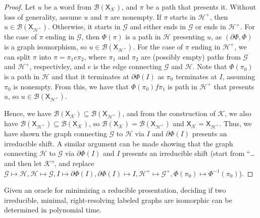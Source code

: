 \documentclass[hidelinks]{article}
\newcommand{\Gc}{\mathcal{G}}  %
\newcommand{\Hc}{\mathcal{H}}  %
\newcommand{\Bc}{\mathcal{B}}
\newcommand{\Kc}{\mathcal{K}}
\newcommand{\shift}[1]{\mathsf{X}_{#1}}
\theoremstyle{definition}
\begin{document}
\begin{proof}
        Let \(u\) be a word from \(\Bc(\shift{\Kc})\), and \(\pi\) be a path that presents it.
        Without loss of generality, assume \(u\) and \(\pi\) are nonempty.
        If \(\pi\) starts in \(\Hc^+\), then \(u \in \Bc(\shift{\Hc^+})\). Otherwise, it 
        starts in \(\Gc\) and either ends in \(\Gc\) or ends in \(\Hc^+\). 
        For the case of \(\pi\) ending in \(\Gc\), then \(\Phi(\pi)\) is a path in 
        \(\Hc\) presenting \(u\), as \((\partial\Phi, \Phi)\) is a graph isomorphism,
        so \(u \in \Bc(\shift{\Hc^+})\).
        For the case of \(\pi\) ending in \(\Hc^+\), we can split 
        \(\pi\) into \(\pi=\pi_1 e \pi_2\), where \(\pi_1\) and \(\pi_2\)
        are (possibly empty) paths from \(\Gc\) and \(\Hc^+\), respectivley, and 
        \(e\) is the edge connecting \(\Gc\) and \(\Hc\). Note 
        that \(\Phi(\pi_0)\) is a path in \(\Hc\) and that it terminates
        at \(\partial\Phi(I)\) as \(\pi_0\) terminates at \(I\), assuming \(\pi_0\) is nonempty.
        From this, we have that \(\Phi(\pi_0)f\pi_1\) is path in \(\Hc^+\) that presents \(u\), 
        so \(u \in \Bc(\shift{\Hc^+})\).

        Hence, we have \(\Bc(\shift{\Kc}) \subseteq \Bc(\shift{\Hc^+})\), and from 
        the construction of \(\Kc\), we also have \(\Bc(\shift{\Hc^+}) \subseteq \Bc(\shift{\Kc})\), 
        so \(\Bc(\shift{\Kc}) = \Bc(\shift{\Hc^+})\) and \(\shift{\Kc} = \shift{\Hc^+}\). Thus,
        we have shown the graph connecting \(\Gc\) to \(\Hc\) via \(I\) and \(\partial\Phi(I)\)
        presents an irreducible shift. A similar argument can be made showing that 
        the graph connecting \(\Hc\) to \(\Gc\) via \(\partial\Phi(I)\) and \(I\) presents 
        an irreducible shift (start from ``\dots and then let \(\Kc\)'', and replace
        \(\Gc \mapsto \Hc, \Hc \mapsto \Gc, I \mapsto \partial\Phi(I), \partial\Phi(I) \mapsto I,
        \Hc^+ \mapsto \Gc^+, \Phi(\pi_0) \mapsto \Phi^{-1}(\pi_0)\)).
    \end{proof}

    \begin{theorem}
        Given an oracle for minimizing a reducible presentation, deciding 
        if two irreducible, minimal, right-resolving labeled graphs are isomorphic can be determined in polynomial time.
    \end{theorem}
\end{document}
